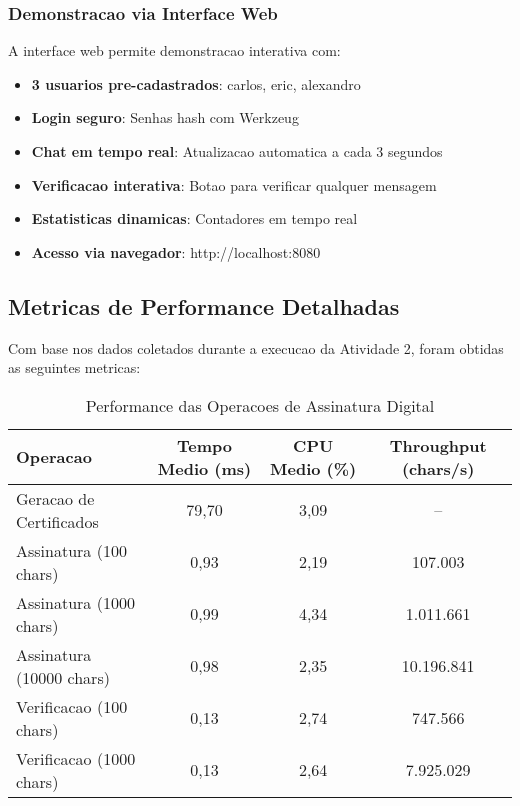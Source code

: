 \documentclass[12pt,a4paper,oneside]{article}
\begin{document}
\subsubsection{Demonstracao via Interface Web}

A interface web permite demonstracao interativa com:

\begin{itemize}
    \item \textbf{3 usuarios pre-cadastrados}: carlos, eric, alexandro
    \item \textbf{Login seguro}: Senhas hash com Werkzeug
    \item \textbf{Chat em tempo real}: Atualizacao automatica a cada 3 segundos
    \item \textbf{Verificacao interativa}: Botao para verificar qualquer mensagem
    \item \textbf{Estatisticas dinamicas}: Contadores em tempo real
    \item \textbf{Acesso via navegador}: http://localhost:8080
\end{itemize}

\subsection{Metricas de Performance Detalhadas}

Com base nos dados coletados durante a execucao da Atividade 2, foram obtidas as seguintes metricas:

\begin{table}[H]
\centering
\caption{Performance das Operacoes de Assinatura Digital}
\label{tab:signature_performance}
\begin{tabular}{lccc}
\toprule
\textbf{Operacao} & \textbf{Tempo Medio (ms)} & \textbf{CPU Medio (\%)} & \textbf{Throughput (chars/s)} \\
\midrule
Geracao de Certificados & 79,70 & 3,09 & -- \\
Assinatura (100 chars) & 0,93 & 2,19 & 107.003 \\
Assinatura (1000 chars) & 0,99 & 4,34 & 1.011.661 \\
Assinatura (10000 chars) & 0,98 & 2,35 & 10.196.841 \\
Verificacao (100 chars) & 0,13 & 2,74 & 747.566 \\
Verificacao (1000 chars) & 0,13 & 2,64 & 7.925.029 \\
\bottomrule
\end{tabular}
\end{table}
\end{document}
